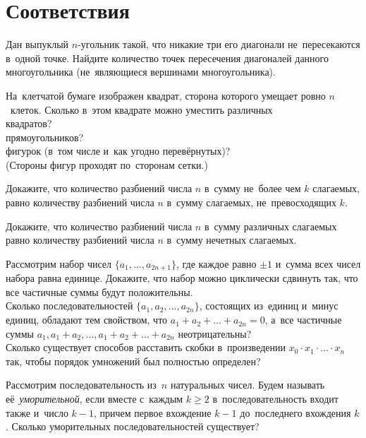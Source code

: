 
\section*{Соответствия}


\begin{problems}

\item
Дан выпуклый $n$-угольник такой, что никакие три его диагонали не~пересекаются
в~одной точке.
Найдите количество точек пересечения диагоналей данного многоугольника
(не~являющиеся вершинами многоугольника).

\item
На~клетчатой бумаге изображен квадрат, сторона которого умещает ровно
$n$~клеток.
Сколько в~этом квадрате можно уместить различных
\\
\sp квадратов?
\\
\sp прямоугольников?
\\
\sp
фигурок 
(в~том числе и~как угодно перевёрнутых)?
\\
(Стороны фигур проходят по~сторонам сетки.)

\item
Докажите, что количество разбиений числа $n$ в~сумму не~более чем
$k$ слагаемых, равно количеству разбиений числа $n$ в~сумму слагаемых,
не~превосходящих $k$.

\item
Докажите, что количество разбиений числа $n$ в~сумму различных слагаемых равно
количеству разбиений числа $n$ в~сумму нечетных слагаемых.

\item
\sp
Рассмотрим набор чисел $\{a_1, \ldots, a_{2n + 1}\}$, где каждое равно
$\pm 1$ и~сумма всех чисел набора равна единице.
Докажите, что набор можно циклически сдвинуть так, что все частичные суммы
будут положительны.
\\
\sp
Сколько последовательностей  $\{a_1, a_2, \ldots , a_{2n}\}$, состоящих
из~единиц и~минус единиц, обладают тем свойством, что 
$a_1 + a_2 + \ldots + a_{2n} = 0$,  а~все частичные суммы
$a_1,  a_1 + a_2, \ldots,  a_1 + a_2 + \ldots + a_{2n}$ неотрицательны?
\\
\sp
Сколько существует способов расставить скобки в~произведении
$x_0 \cdot x_1 \cdot \ldots \cdot x_n$ так, чтобы порядок умножений был
полностью определен?

\item
Рассмотрим последовательность из~$n$ натуральных чисел.
Будем называть её~\emph{уморительной}, если вместе с~каждым $k \geqslant 2$
в~последовательность входит также и~число $k - 1$, причем первое вхождение
$k - 1$ до~последнего вхождения $k$.
Сколько уморительных последовательностей существует?

\end{problems}

